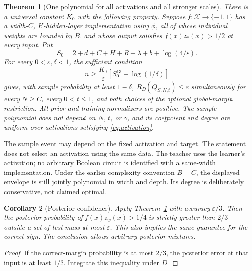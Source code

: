 \documentclass[11pt]{article}
\newtheorem{theorem}{Theorem}
\newtheorem{corollary}[theorem]{Corollary}
\begin{document}
\begin{theorem}[One polynomial for all activations and all stronger scales]
\label{thm:poly}
There is a universal constant $K_0$ with the following property. Suppose
$f:\mathcal X\to\{-1,1\}$ has a width-$C$, $H$-hidden-layer implementation
using $\phi$, all of whose individual weights are bounded by $B$, and whose
output satisfies $f(x)z_*(x)>1/2$ at every input. Put
\[
 S_0=2+d+C+H+B+\lambda+b+\log(4/\varepsilon).
\]
For every $0<\varepsilon,\delta<1$, the sufficient condition
\begin{equation}\label{eq:poly-budget}
 n\ge\frac{K_0}{\varepsilon}
       \left[S_0^{13}+\log(1/\delta)\right]
\end{equation}
gives, with sample probability at least $1-\delta$,
$R_D(Q_{S,N,t})\le\varepsilon$ simultaneously for every $N\ge C$, every
$0<t\le1$, and both choices of the optional global-margin restriction.
All prior and training normalizers are positive. The sample polynomial
does not depend on $N$, $t$, or $\gamma$, and its coefficient and degree
are uniform over activations satisfying \eqref{eq:activation}.
\end{theorem}

The sample event may depend on the fixed activation and target. The
statement does not select an activation using the same data. The teacher
uses the learner's activation; no arbitrary Boolean circuit is identified
with a same-width implementation. Under the earlier complexity convention
$B=C$, the displayed envelope is still jointly polynomial in width and
depth. Its degree is deliberately conservative, not claimed optimal.

\begin{corollary}[Posterior confidence]
Apply Theorem~\ref{thm:poly} with accuracy $\varepsilon/3$. Then the posterior
probability of $f(x)z_w(x)>1/4$ is strictly greater than $2/3$ outside a set
of test mass at most $\varepsilon$. This also implies the same guarantee
for the correct sign. The conclusion allows arbitrary posterior mixtures.
\end{corollary}
\begin{proof}
If the correct-margin probability is at most $2/3$, the posterior error at
that input is at least $1/3$. Integrate this inequality under $D$.
\end{proof}
\end{document}
